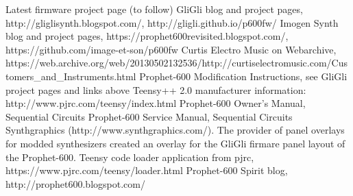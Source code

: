 \documentclass[landscape, 11pt, oneside, twoside]{report}
\begin{document}
\begin{thebibliography}{50} 

Latest firmware project page (to follow)
GliGli blog and project pages, http://gliglisynth.blogspot.com/, http://gligli.github.io/p600fw/
Imogen Synth blog and project pages, https://prophet600revisited.blogspot.com/, https://github.com/image-et-son/p600fw
Curtis Electro Music on Webarchive, https://web.archive.org/web/20130502132536/http://curtiselectromusic.com/Customers\_and\_Instruments.html
 Prophet-600 Modification Instructions, see GliGli project pages and links above
Teensy++ 2.0 manufacturer information: http://www.pjrc.com/teensy/index.html
Prophet-600 Owner's Manual, Sequential Circuits
 Prophet-600 Service Manual, Sequential Circuits
 Synthgraphics (http://www.synthgraphics.com/). The provider of panel overlays for modded synthesizers created an overlay for the GliGli firmare panel layout of the Prophet-600.
 Teensy code loader application from pjrc, https://www.pjrc.com/teensy/loader.html
Prophet-600 Spirit blog, http://prophet600.blogspot.com/

\end{thebibliography}
\end{document}
